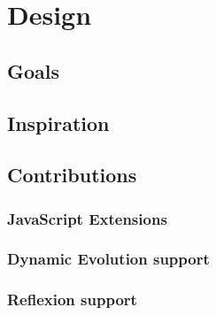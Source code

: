 \chapter{Design}
\label{chap:Design}

\section{Goals}

\section{Inspiration}

\section{Contributions}

\subsection{JavaScript Extensions}

\subsection{Dynamic Evolution support}

\subsection{Reflexion support}

